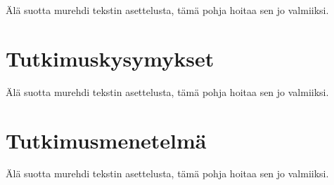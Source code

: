 Älä suotta murehdi tekstin asettelusta, tämä pohja hoitaa sen jo valmiiksi.

\section{Tutkimuskysymykset}

Älä suotta murehdi tekstin asettelusta, tämä pohja hoitaa sen jo valmiiksi.

\section{Tutkimusmenetelmä}

Älä suotta murehdi tekstin asettelusta, tämä pohja hoitaa sen jo valmiiksi.
